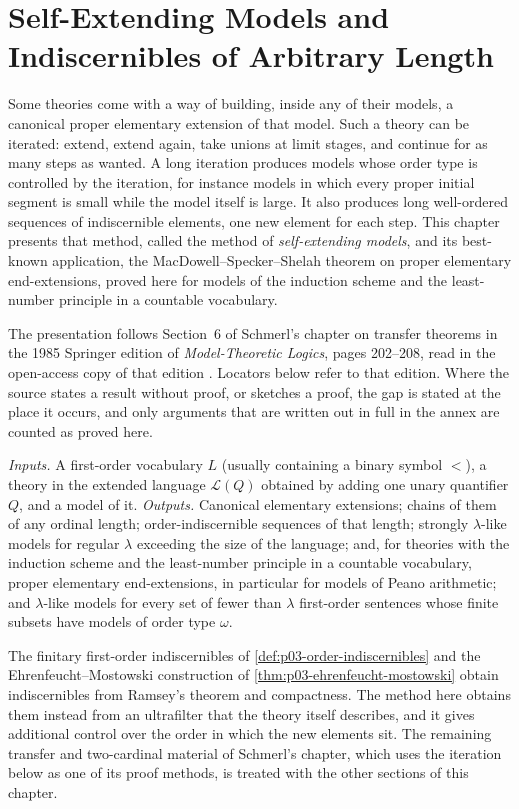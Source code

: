 \chapter{Self-Extending Models and Indiscernibles of Arbitrary Length}
\label{sec:p03-w03-p03-030-self-extending}

Some theories come with a way of building, inside any of their models, a
canonical proper elementary extension of that model.  Such a theory can be
iterated: extend, extend again, take unions at limit stages, and continue
for as many steps as wanted.  A long iteration produces models whose order
type is controlled by the iteration, for instance models in which every
proper initial segment is small while the model itself is large.  It also
produces long well-ordered sequences of indiscernible elements, one new
element for each step.  This chapter presents that method, called the method
of \emph{self-extending models}, and its best-known application, the
MacDowell--Specker--Shelah theorem on proper elementary end-extensions,
proved here for models of the induction scheme and the least-number
principle in a countable vocabulary.

The presentation follows Section~6 of Schmerl's chapter on transfer theorems
in the 1985 Springer edition of \emph{Model-Theoretic Logics}, pages
202--208, read in the open-access copy of that edition
\cite[pp.~202--208]{Schmerl1985TransferTheorems}.  Locators below refer to
that edition.  Where the source states a result without proof, or sketches a
proof, the gap is stated at the place it occurs, and only arguments that are
written out in full in the annex are counted as proved here.

\emph{Inputs.}  A first-order vocabulary \(L\) (usually containing a binary
symbol \(<\)), a theory in the extended language \(\mathscr L(Q)\) obtained
by adding one unary quantifier \(Q\), and a model of it.  \emph{Outputs.}
Canonical elementary extensions; chains of them of any ordinal length;
order-indiscernible sequences of that length; strongly \(\lambda\)-like
models for regular \(\lambda\) exceeding the size of the language; and, for
theories with the induction scheme and the least-number principle in a
countable vocabulary, proper elementary end-extensions, in particular for
models of Peano arithmetic; and \(\lambda\)-like models for every set of
fewer than \(\lambda\) first-order sentences whose finite subsets have models
of order type \(\omega\).

The finitary first-order indiscernibles of
\cref{def:p03-order-indiscernibles} and the Ehrenfeucht--Mostowski
construction of \cref{thm:p03-ehrenfeucht-mostowski} obtain indiscernibles
from Ramsey's theorem and compactness.  The method here obtains them instead
from an ultrafilter that the theory itself describes, and it gives
additional control over the order in which the new elements sit.  The
remaining transfer and two-cardinal material of Schmerl's chapter, which uses
the iteration below as one of its proof methods, is treated with the other
sections of this chapter.

